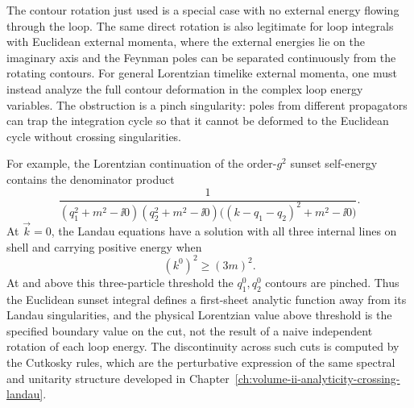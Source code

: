 \begin{proposition}
\label{prop:loop-rotation-pinch-obstruction}
The contour rotation just used is a special case with no external energy
flowing through the loop.  The same direct rotation is also legitimate for
loop integrals with Euclidean external momenta, where the external energies
lie on the imaginary axis and the Feynman poles can be separated continuously
from the rotating contours.  For general Lorentzian timelike external momenta,
one must instead analyze the full contour deformation in the complex loop
energy variables.  The obstruction is a pinch singularity: poles from different
propagators can trap the integration cycle so that it cannot be deformed to
the Euclidean cycle without crossing singularities.

For example, the Lorentzian continuation of the order-\(g^2\) sunset
self-energy contains the denominator product
\[
  \frac{1}{
  (q_1^2+m^2-\ii0)(q_2^2+m^2-\ii0)
  \bigl((k-q_1-q_2)^2+m^2-\ii0\bigr)} .
\]
At \(\vec k=0\), the Landau equations have a solution with all three internal
lines on shell and carrying positive energy when
\[
  (k^0)^2\ge (3m)^2 .
\]
At and above this three-particle threshold the \(q_1^0,q_2^0\) contours are
pinched.  Thus the Euclidean sunset integral defines a first-sheet analytic
function away from its Landau singularities, and the physical Lorentzian value
above threshold is the specified boundary value on the cut, not the result of
a naive independent rotation of each loop energy.  The discontinuity across
such cuts is computed by the Cutkosky rules, which are the perturbative
expression of the same spectral and unitarity structure developed in
Chapter~\ref{ch:volume-ii-analyticity-crossing-landau}.
\end{proposition}


